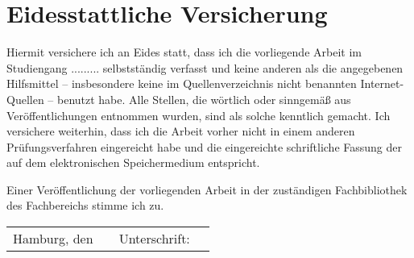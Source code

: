 \chapter*{Eidesstattliche Versicherung}

Hiermit versichere ich an Eides statt, dass ich die vorliegende Arbeit im Studiengang ......... selbstständig verfasst und keine anderen als die angegebenen Hilfsmittel – insbesondere keine im Quellenverzeichnis nicht benannten Internet-Quellen – benutzt habe. Alle Stellen, die wörtlich oder sinngemäß aus Veröffentlichungen entnommen wurden, sind als solche kenntlich gemacht. Ich versichere weiterhin, dass ich die Arbeit vorher nicht in einem anderen Prüfungsverfahren eingereicht habe und die eingereichte schriftliche Fassung der auf dem elektronischen Speichermedium entspricht.\newline

\noindent
Einer Veröffentlichung der vorliegenden Arbeit in der zuständigen Fachbibliothek des Fachbereichs stimme ich zu.\newline


\vspace{25mm}

\noindent
\begin{tabular}{@{}p{2.5cm}p{3cm}p{2cm}p{7cm}}
Hamburg, den  & \hrulefill & Unterschrift: & \hrulefill \\
\end{tabular}


  



\begin{comment}
    Bei der Abgabe der Abschlussarbeit ist eine Versicherung an Eides statt (lt. § 59 Abs. 3 HmbHG) abzugeben:

„Hiermit versichere ich an Eides statt, dass ich die vorliegende Arbeit im Studiengang ...*) selbstständig verfasst und keine anderen als die angegebenen Hilfsmittel – insbesondere keine im Quellenverzeichnis nicht benannten Internet-Quellen – benutzt habe. Alle Stellen, die wörtlich oder sinngemäß aus Veröffentlichungen entnommen wurden, sind als solche kenntlich gemacht. Ich versichere weiterhin, dass ich die Arbeit vorher nicht in einem anderen Prüfungsverfahren eingereicht habe und die eingereichte schriftliche Fassung der auf dem elektronischen Speichermedium entspricht.“             *) bitte Ihren Studiengang und Abschluss eintragen

Die Angabe zur Veröffentlichung in der Fachbibliothek können Sie direkt in die Versicherung mit einbeziehen:

"Einer Veröffentlichung der vorliegenden Arbeit in der zuständigen Fachbibliothek des Fachbereichs stimme ich zu/stimme ich nicht zu."

Bitte drucken Sie diese Versicherung in jedem Exemplar am Ende ab und unterschreiben Sie diese mit der Angabe von Ort und Datum.
\end{comment}




